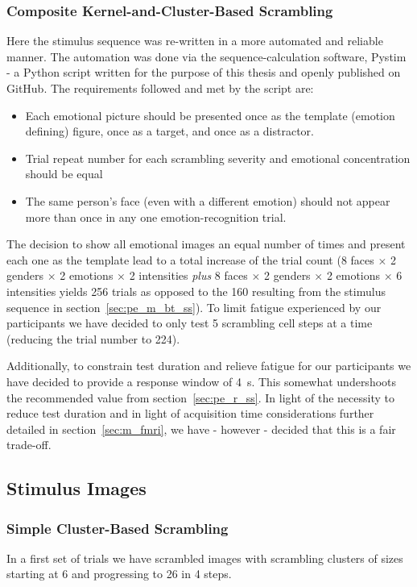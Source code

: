 	    \subsubsection{Composite Kernel-and-Cluster-Based Scrambling}\label{sec:pe_m_bt_cs}
		Here the stimulus sequence was re-written in a more automated and reliable manner.
		The automation was done via the sequence-calculation software, Pystim \citep{pystim} - a Python script written for the purpose of this thesis and openly published on GitHub.
		The requirements followed and met by the script are:
		\begin{itemize}
		    \item Each emotional picture should be presented once as the template (emotion defining) figure, once as a target, and once as a distractor.
		    \item Trial repeat number for each scrambling severity and emotional concentration should be equal
		    \item The same person's face (even with a different emotion) should not appear more than once in any one emotion-recognition trial.
		\end{itemize}
		The decision to show all emotional images an equal number of times and present each one as the template lead to a total increase of the trial count
		(8 faces $\times$ 2 genders $\times$ 2 emotions $\times$ 2 intensities \textit{plus} 8 faces $\times$ 2 genders $\times$ 2 emotions $\times$ 6 intensities yields 256 trials as opposed to the 160 resulting from the stimulus sequence in section~\ref{sec:pe_m_bt_ss}).
		To limit fatigue experienced by our participants we have decided to only test 5 scrambling cell steps at a time (reducing the trial number to 224).
		
		Additionally, to constrain test duration and relieve fatigue for our participants we have decided to provide a response window of \SI{4}{\second}.
		This somewhat undershoots the recommended value from section~\ref{sec:pe_r_ss}.
		In light of the necessity to reduce test duration and in light of acquisition time considerations further detailed in section~\ref{sec:m_fmri}, we have - however - decided that this is a fair trade-off.
	\subsection{Stimulus Images}\label{sec:pe_m_si}
	    \subsubsection{Simple Cluster-Based Scrambling}
		In a first set of trials we have scrambled images with scrambling clusters of sizes starting at \SI{6}{\pixel} and progressing to \SI{26}{\pixel} in \SI{4}{\pixel} steps.

